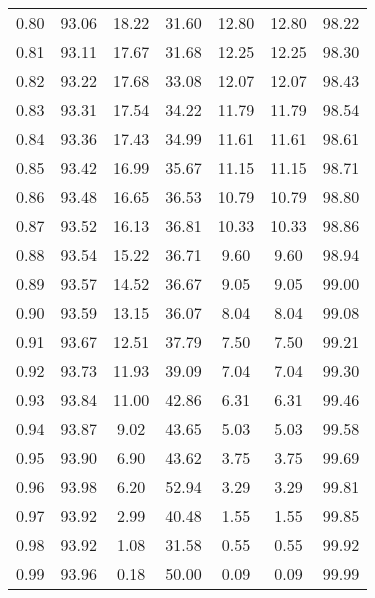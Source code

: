 \begin{tabular}{|c|c|c|c|c|c|c|}
      0.80 &     93.06 &     18.22 &      31.60 &   12.80 &      12.80 &         98.22 \\
      0.81 &     93.11 &     17.67 &      31.68 &   12.25 &      12.25 &         98.30 \\
      0.82 &     93.22 &     17.68 &      33.08 &   12.07 &      12.07 &         98.43 \\
      0.83 &     93.31 &     17.54 &      34.22 &   11.79 &      11.79 &         98.54 \\
      0.84 &     93.36 &     17.43 &      34.99 &   11.61 &      11.61 &         98.61 \\
      0.85 &     93.42 &     16.99 &      35.67 &   11.15 &      11.15 &         98.71 \\
      0.86 &     93.48 &     16.65 &      36.53 &   10.79 &      10.79 &         98.80 \\
      0.87 &     93.52 &     16.13 &      36.81 &   10.33 &      10.33 &         98.86 \\
      0.88 &     93.54 &     15.22 &      36.71 &    9.60 &       9.60 &         98.94 \\
      0.89 &     93.57 &     14.52 &      36.67 &    9.05 &       9.05 &         99.00 \\
      0.90 &     93.59 &     13.15 &      36.07 &    8.04 &       8.04 &         99.08 \\
      0.91 &     93.67 &     12.51 &      37.79 &    7.50 &       7.50 &         99.21 \\
      0.92 &     93.73 &     11.93 &      39.09 &    7.04 &       7.04 &         99.30 \\
      0.93 &     93.84 &     11.00 &      42.86 &    6.31 &       6.31 &         99.46 \\
      0.94 &     93.87 &      9.02 &      43.65 &    5.03 &       5.03 &         99.58 \\
      0.95 &     93.90 &      6.90 &      43.62 &    3.75 &       3.75 &         99.69 \\
      0.96 &     93.98 &      6.20 &      52.94 &    3.29 &       3.29 &         99.81 \\
      0.97 &     93.92 &      2.99 &      40.48 &    1.55 &       1.55 &         99.85 \\
      0.98 &     93.92 &      1.08 &      31.58 &    0.55 &       0.55 &         99.92 \\
      0.99 &     93.96 &      0.18 &      50.00 &    0.09 &       0.09 &         99.99 \\
\bottomrule
\end{tabular}
